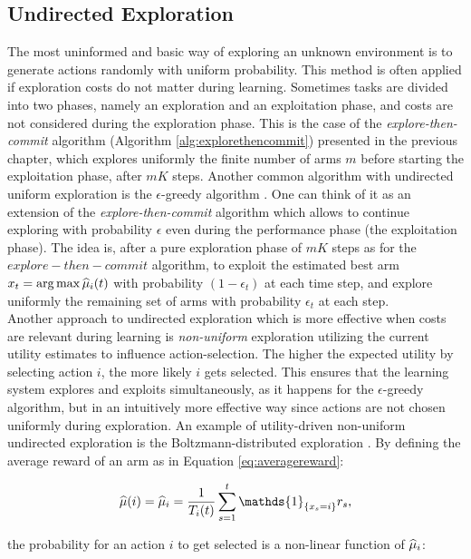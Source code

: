 \subsection{Undirected Exploration}
The most uninformed and basic way of exploring an unknown environment is to generate actions randomly with uniform probability. This method is often applied if exploration costs do not matter during learning. Sometimes tasks are divided into two phases, namely an exploration and an exploitation phase, and costs are not considered during the exploration phase. This is the case of the \emph{explore-then-commit} algorithm (Algorithm \ref{alg:explorethencommit}) presented in the previous chapter, which explores uniformly the finite number of arms $m$ before starting the exploitation phase, after $mK$ steps. Another common algorithm with undirected uniform exploration is the $\epsilon$-greedy algorithm \cite{lattimore2019bandit}. One can think of it as an extension of the \emph{explore-then-commit} algorithm which allows to continue exploring with probability $\epsilon$ even during the performance phase (\ie the exploitation phase). The idea is, after a pure exploration phase of $mK$ steps as for the $explore-then-commit$ algorithm, to exploit the estimated best arm $x_t = \arg \max \widehat{\mu}_i(t)$ with probability $(1-\epsilon_t)$ at each time step, and explore uniformly the remaining set of arms with probability $\epsilon_t$ at each step. \\
Another approach to undirected exploration which is more effective when costs are relevant during learning is \emph{non-uniform} exploration utilizing the current utility estimates to influence action-selection. The higher the expected utility by selecting action $i$, the more likely $i$ gets selected. This ensures that the learning system explores and exploits simultaneously, as it happens for the $\epsilon$-greedy algorithm, but in an intuitively more effective way since actions are not chosen uniformly during exploration. An example of utility-driven non-uniform undirected exploration is the  Boltzmann-distributed exploration \cite{cesa2017boltzmann}. By defining the average reward of an arm as in Equation \ref{eq:averagereward}:

\begin{equation}
\wh{\mu}(i) = \wh{\mu}_i = \frac{1}{T_i(t)}\sum_{s=1}^{t}\mathds{1}_{\{x_s=i\}}r_s,
\end{equation}

the probability for an action $i$ to get selected is a non-linear function of $\widehat{\mu}_i$:

